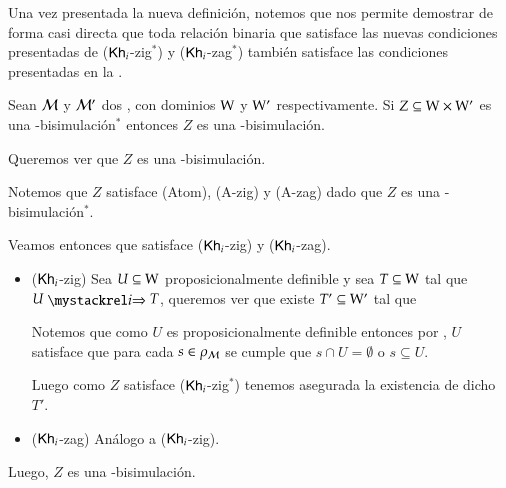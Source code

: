 Una vez presentada la nueva definición, notemos que  nos permite demostrar de forma casi directa que
toda relación binaria que satisface las nuevas condiciones presentadas de ($\mathsf{Kh}_i$-zig$^*$) y ($\mathsf{Kh}_i$-zag$^*$) también satisface las condiciones
presentadas en la .

\begin{lema}\label{lema:new_bisim-implies-old_bisim}
    Sean $\mathcal{M}$ y $\mathcal{M}'$ dos \ultss, con dominios $\mathrm{W}$ y $\mathrm{W}'$ respectivamente. Si $Z \subseteq \mathrm{W} \times \mathrm{W}'$ es una \KHilogic-bisimulación$^*$ entonces $Z$ es una \KHilogic-bisimulación.
\end{lema}

\begin{demostracion}
    Queremos ver que $Z$ es una \KHilogic-bisimulación.

    Notemos que $Z$ satisface (Atom), (A-zig) y (A-zag) dado que $Z$ es una \KHilogic-bisimulación$^*$.

    Veamos entonces que satisface ($\mathsf{Kh}_i$-zig) y ($\mathsf{Kh}_i$-zag).

    \begin{itemize}
        \item ($\mathsf{Kh}_i$-zig) Sea $U \subseteq \mathrm{W}$ proposicionalmente definible y sea $T \subseteq \mathrm{W}$ tal que $U \ultsExecAgi T$, queremos ver que existe
        $T' \subseteq \mathrm{W}'$ tal que

        \begin{multicols}{2}
        \end{multicols}
        Notemos que como $U$ es proposicionalmente definible entonces por , $U$ satisface que para cada $s \in \rho_{\mathcal{M}}$ se cumple
        que $s \cap U = \emptyset$ o $s \subseteq U$.
    
        Luego como $Z$ satisface ($\mathsf{Kh}_i$-zig$^*$) tenemos asegurada la existencia de dicho $T'$.
    
        \item ($\mathsf{Kh}_i$-zag) Análogo a ($\mathsf{Kh}_i$-zig).
    \end{itemize}

    Luego, $Z$ es una \KHilogic-bisimulación.
\end{demostracion}


